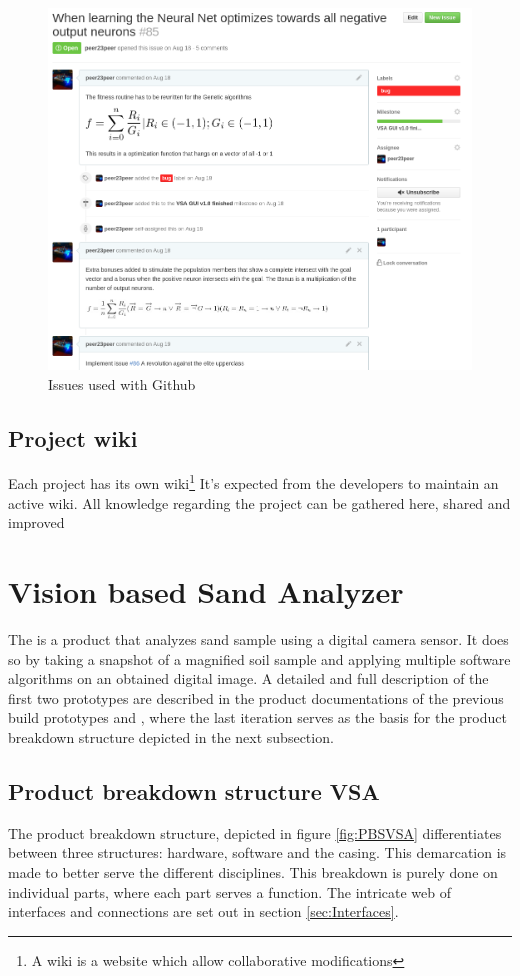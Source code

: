 \documentclass[fleqn,10pt]{SelfArx} %
\begin{document}
\begin{figure}[h]
	\includegraphics[width=\textwidth/2]{../images/issue.png}
	\caption{Issues used with Github}\label{fig:issue}
\end{figure}

\subsection{Project wiki}
Each project has its own wiki\footnote{A wiki is a website which allow collaborative modifications} It's expected from the developers to maintain an active wiki. All knowledge regarding the project can be gathered here, shared and improved

\section{Vision based Sand Analyzer}\label{sec:Vision based Sand Analyzer}
The \vsa is a product that analyzes sand sample using a digital camera sensor. It does so by taking a snapshot of a magnified soil sample and applying multiple software algorithms on an obtained digital image. A detailed and full description of the first two prototypes are described in the product documentations of the previous build prototypes \cite{jelle_spijker_vision_2015} and \cite{spijker_product_2014}, where the last iteration serves as the basis for the product breakdown structure depicted in the next subsection.

\subsection{Product breakdown structure VSA}
The product breakdown structure, depicted in figure \ref{fig:PBSVSA} differentiates between three structures: hardware, software and the casing. This demarcation is made to better serve the different disciplines. This breakdown is purely done on individual parts, where each part serves a function. The intricate web of interfaces and connections are set out in section \ref{sec:Interfaces}.
\end{document}
